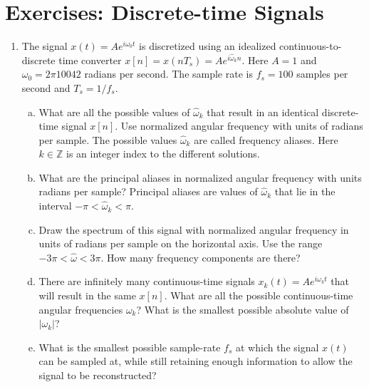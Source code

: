 \newpage
\section{Exercises: Discrete-time Signals}

\begin{enumerate}
  \item The signal $x(t) = A e^{i\omega_0 t}$ is discretized using an idealized continuous-to-discrete 
        time converter $x[n]=x(n T_s)=Ae^{i\hat{\omega}_{k}n}$. Here $A=1$ and $\omega_0=2\pi 10042$ 
        radians per second. The sample rate is $f_s=100$ samples per second and $T_s=1/f_s$.
        \begin{enumerate}[a)]
          \item What are all the possible values of $\hat{\omega}_k$ that result in an identical 
                discrete-time signal $x[n]$. Use normalized angular frequency with units of 
                radians per sample. The possible values $\hat{\omega}_k$ are called 
                frequency aliases. Here $k\in \mathbb{Z}$ is an integer index to the 
                different solutions.
          \item What are the principal aliases in normalized angular frequency with units 
                radians per sample? Principal aliases are values of $\hat{\omega}_k$ that 
                lie in the interval $-\pi < \hat{\omega}_k < \pi$.
          \item Draw the spectrum of this signal with normalized angular frequency in units of 
                radians per sample on the horizontal axis. Use the range $-3\pi < \hat{\omega} < 3\pi$. 
                How many frequency components are there?
          \item There are infinitely many continuous-time signals $x_k(t)=A e^{i\omega_k t}$ 
                that will result in the same $x[n]$. What are all the possible continuous-time 
                angular frequencies $\omega_k$? What is the smallest possible absolute value of $|\omega_k|$?
          \item What is the smallest possible sample-rate $f_s$ at which the signal $x(t)$ can be sampled at, 
                while still retaining enough information to allow the signal to be reconstructed?
        \end{enumerate}


\end{enumerate}
